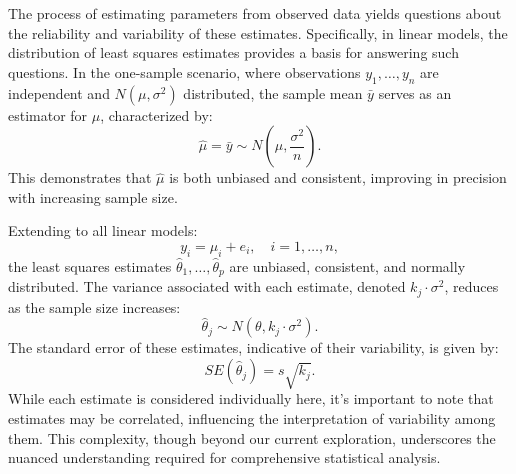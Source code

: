 \documentclass{article}
\begin{document}
The process of estimating parameters from observed data yields questions about the reliability and variability of these estimates. Specifically, in linear models, the distribution of least squares estimates provides a basis for answering such questions. In the one-sample scenario, where observations \(y_1, \ldots, y_n\) are independent and \(N(\mu, \sigma^2)\) distributed, the sample mean \(\bar{y}\) serves as an estimator for \(\mu\), characterized by:
\begin{equation}
\hat{\mu} = \bar{y} \sim N(\mu, \frac{\sigma^2}{n}). \tag{5.11}
\end{equation}
This demonstrates that \(\hat{\mu}\) is both unbiased and consistent, improving in precision with increasing sample size.

Extending to all linear models:
\begin{equation}
y_i = \mu_i + e_i, \quad i = 1, \ldots, n, \tag{5.12}
\end{equation}
the least squares estimates \(\hat{\theta}_1, \ldots, \hat{\theta}_p\) are unbiased, consistent, and normally distributed. The variance associated with each estimate, denoted \(k_j \cdot \sigma^2\), reduces as the sample size increases:
\begin{equation}
\hat{\theta}_j \sim N(\theta, k_j \cdot \sigma^2). \tag{5.13}
\end{equation}
The standard error of these estimates, indicative of their variability, is given by:
\begin{equation}
SE(\hat{\theta}_j) = s\sqrt{k_j}. \tag{5.14}
\end{equation}
While each estimate is considered individually here, it's important to note that estimates may be correlated, influencing the interpretation of variability among them. This complexity, though beyond our current exploration, underscores the nuanced understanding required for comprehensive statistical analysis.
\end{document}
